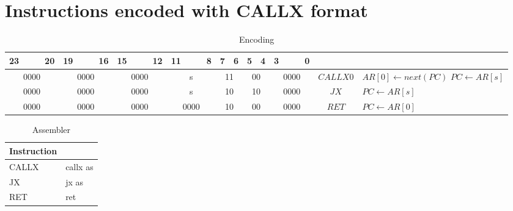 \section{Instructions encoded with CALLX format}
\begin{smalltables}
	\begin{longtable}{llllllllllllllllllllllll  p{1cm}  p{6cm} | }
		\caption{Encoding\label{long}}\\
		23 & & & 20 & 19 & & & 16 & 15 & & & 12 & 11 & & & 8 & 7 & 6 & 5 & 4 & 3 & & & 0 & & \multicolumn{1}{c}{}\\
		\hline
		\multicolumn{4}{|c|}{0000} & \multicolumn{4}{c|}{0000} & \multicolumn{4}{c|}{0000} & \multicolumn{4}{c|}{s} & \multicolumn{2}{c|}{11} & \multicolumn{2}{c|}{00} & \multicolumn{4}{c|}{0000} & \multicolumn{1}{c|}{$CALLX0$} & $AR[0] \leftarrow next(PC)$ \newline $PC \leftarrow AR[s]$\\ \hline
		\multicolumn{4}{|c|}{0000} & \multicolumn{4}{c|}{0000} & \multicolumn{4}{c|}{0000} & \multicolumn{4}{c|}{s} & \multicolumn{2}{c|}{10} & \multicolumn{2}{c|}{10} & \multicolumn{4}{c|}{0000} & \multicolumn{1}{c|}{$JX$} & $PC \leftarrow AR[s]$\\ \hline
		\multicolumn{4}{|c|}{0000} & \multicolumn{4}{c|}{0000} & \multicolumn{4}{c|}{0000} & \multicolumn{4}{c|}{0000} & \multicolumn{2}{c|}{10} & \multicolumn{2}{c|}{00} & \multicolumn{4}{c|}{0000} & \multicolumn{1}{c|}{$RET$} & $PC \leftarrow AR[0]$\\ \hline
	\end{longtable}

	\begin{longtable}{|p{5cm}|p{5cm}|}
		\caption{Assembler\label{long}}\\
		\hline
		Instruction & \\
		\hline
		CALLX & callx as\\ \hline
		JX & jx as\\ \hline
		RET & ret \\ \hline
	\end{longtable}
\end{smalltables}